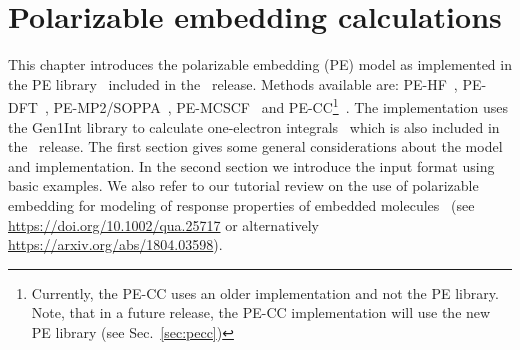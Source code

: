 \chapter{Polarizable embedding calculations}\label{ch:embedding}

This chapter introduces the polarizable embedding (PE) model\cite{pemodel1,pemodel2} as implemented
in the PE library~\cite{pelib} included in the \latestrelease\ release.
Methods available are: PE-HF~\cite{pescf}, PE-DFT~\cite{pescf},
PE-MP2/SOPPA~\cite{pesoppa}, PE-MCSCF~\cite{pemcscf}
and PE-CC\footnote{Currently, the PE-CC uses an older implementation
and not the PE library. Note, that in a future release, the PE-CC
implementation will use the new PE library (see Sec.~\ref{sec:pecc})}~\cite{pecc}.
The implementation uses the Gen1Int library to calculate one-electron
integrals~\cite{gen1int} which is also included in the \latestrelease\ release. The
first section gives some general considerations about the model and
implementation. In the second section we introduce the input format using
basic examples.
We also refer to our tutorial review on the use of polarizable embedding for modeling of response properties of embedded molecules~\cite{petutorial} (see \url{https://doi.org/10.1002/qua.25717} or alternatively \url{https://arxiv.org/abs/1804.03598}).

